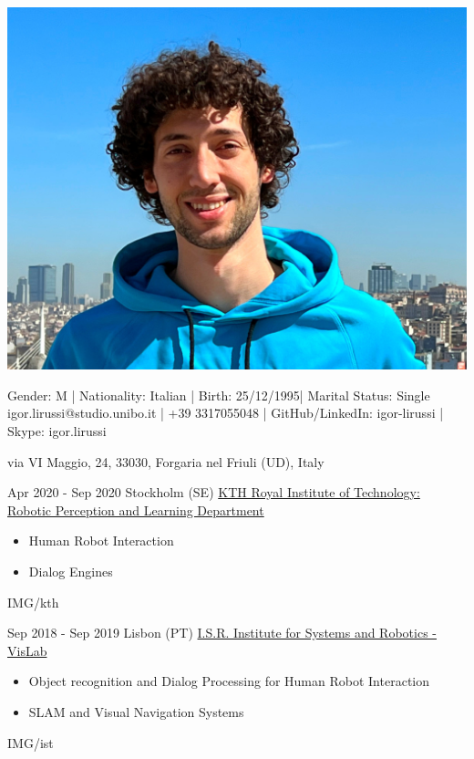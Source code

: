 \documentclass[paper=a4,fontsize=11pt, hidelinks]{temp} %
\begin{document}
\begin{minipage}{.2\linewidth}
   \includegraphics[width=1\textwidth]{photo}
\end{minipage}      
\begin{minipage}{0.7\linewidth}
   \sepspace
   \noindent
   \hfill Gender: M | Nationality: Italian | Birth: 25/12/1995| Marital Status: Single
   \hfill igor.lirussi@studio.unibo.it | +39 3317055048 | GitHub/LinkedIn: igor-lirussi | Skype: igor.lirussi
   
   \hfill via VI Maggio, 24, 33030, Forgaria nel Friuli (UD), Italy
 
\end{minipage}


\noindent

{Apr 2020 - Sep 2020}
{Stockholm (SE) \href{https://www.kth.se/is/rpl}{KTH Royal Institute of Technology: Robotic Perception and Learning Department}}
{
 \begin{itemize}
    \item Human Robot Interaction
    \item Dialog Engines
 \end{itemize}
} {IMG/kth}

\sepspace

{Sep 2018 - Sep 2019 }
{Lisbon (PT) \href{https://welcome.isr.tecnico.ulisboa.pt/}{ I.S.R. Institute for Systems and Robotics - VisLab}}
{
 \begin{itemize}
    \item Object recognition and Dialog Processing for Human Robot Interaction
    \item SLAM and Visual Navigation Systems
 \end{itemize}
} {IMG/ist}
\end{document}
